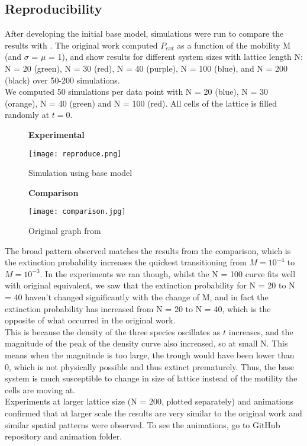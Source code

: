 \documentclass[11pt]{article}
\begin{document}
\subsection{Reproducibility}
After developing the initial base model, simulations were run to compare the results with \cite{rps}. The original work computed $P_{ext}$ as a function of the mobility M (and $\sigma$ = $\mu$ = 1), and show results for different system sizes with lattice length N: N = 20 (green), N = 30 (red), N = 40 (purple), N = 100 (blue), and N = 200 (black) over 50-200 simulations.\\
We computed 50 simulations per data point with N = 20 (blue), N = 30 (orange), N = 40 (green) and N = 100 (red). All cells of the lattice is filled randomly at $t=0$.\\
\begin{figure}[H]
            \centering
            \textbf{Experimental}\par
            \texttt{[image: reproduce.png]}
            \caption{Simulation using base model}
\end{figure}
\begin{figure}[H]
            \centering
            \textbf{Comparison}\par
            \texttt{[image: comparison.jpg]}
            \caption{Original graph from \cite{rps}}
\end{figure}
\noindent The broad pattern observed matches the results from the comparison, which is the extinction probability increases the quickest transitioning from $M=10^{-4}$ to $M=10^{-3}$. In the experiments we ran though, whilst the N = 100 curve fits well with original equivalent, we saw that the extinction probability for N = 20 to N = 40 haven't changed significantly with the change of M, and in fact the extinction probability has increased from N = 20 to N = 40, which is the opposite of what occurred in the original work.\\
This is because the density of the three species oscillates as $t$ increases, and the magnitude of the peak of the density curve also increased, so at small N. This means when the magnitude is too large, the trough would have been lower than 0, which is not physically possible and thus extinct prematurely. Thus, the base system is much susceptible to change in size of lattice instead of the motility the cells are moving at.\\
Experiments at larger lattice size (N = 200, plotted separately) and animations confirmed that at larger scale the results are very similar to the original work and similar spatial patterns were observed. To see the animations, go to GitHub repository and animation folder.
\end{document}
